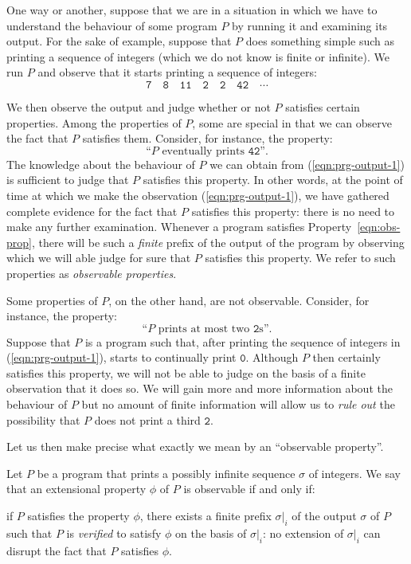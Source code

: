 One way or another, suppose that we are in a situation in which we have to understand the
behaviour of some program $P$ by running it and examining its output. For the sake of
example, suppose that $P$ does something simple such as printing a sequence of integers
(which we do not know is finite or infinite). We run $P$ and observe that it starts
printing a sequence of integers:
\begin{equation}\label{eqn:prg-output-1}
  \mathtt{7 \quad 8 \quad 11 \quad 2 \quad 2 \quad 42 \quad \cdots}
\end{equation}

We then observe the output and judge whether or not $P$ satisfies certain properties.
Among the properties of $P$, some are special in that we can observe the fact that $P$
satisfies them. Consider, for instance, the property:
\begin{equation}\label{eqn:obs-prop}
  \text{``$P$ eventually prints $\mathtt{42}$''}.
\end{equation}
The knowledge about the behaviour of $P$ we can obtain from (\ref{eqn:prg-output-1}) is
sufficient to judge that $P$ satisfies this property. In other words, at the point of time
at which we make the observation (\ref{eqn:prg-output-1}), we have gathered complete
evidence for the fact that $P$ satisfies this property: there is no need to make any
further examination. Whenever a program satisfies Property~\ref{eqn:obs-prop}, there will
be such a \emph{finite} prefix of the output of the program by observing which we will
able judge for sure that $P$ satisfies this property. We refer to such properties as
\emph{observable properties}.

Some properties of $P$, on the other hand, are not observable. Consider, for instance,
the property:
\begin{equation}\label{eqn:non-obs-prop}
  \text{``$P$ prints at most two $\mathtt{2}$s''}.
\end{equation}
Suppose that $P$ is a program such that, after printing the sequence of integers in
(\ref{eqn:prg-output-1}), starts to continually print $\mathtt{0}$. Although $P$ then
certainly satisfies this property, we will not be able to judge on the basis of a finite
observation that it does so. We will gain more and more information about the behaviour of
$P$ but no amount of finite information will allow us to \emph{rule out} the possibility
that $P$ does not print a third $\mathtt{2}$.

Let us then make precise what exactly we mean by an ``observable property''.
\begin{defn}
  Let $P$ be a program that prints a possibly infinite sequence $\sigma$ of integers. We say
  that an extensional property $\phi$ of $P$ is observable if and only if:
  \begin{center}
    if $P$ satisfies the property $\phi$, there exists a finite prefix $\sigma|_i$ of the output
    $\sigma$ of $P$ such that $P$ is \emph{verified} to satisfy $\phi$ on the basis of $\sigma|_i$:
    no extension of $\sigma|_i$ can disrupt the fact that $P$ satisfies $\phi$.
  \end{center}
\end{defn}

